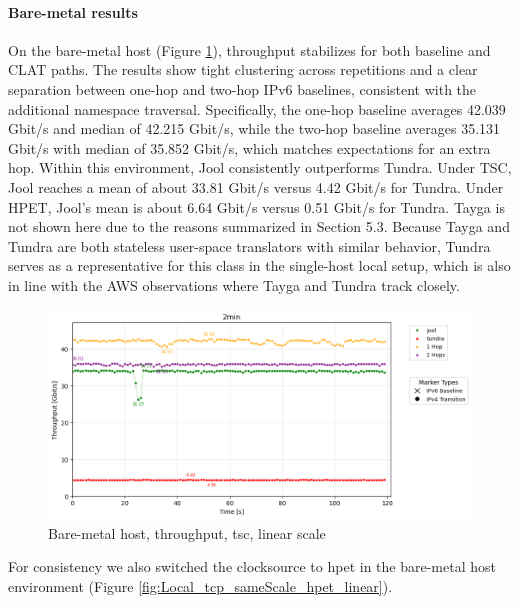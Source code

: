 \paragraph{Bare-metal results}

On the bare-metal host (Figure \ref{fig:Local_tcp_sameScale_tsc_linear}), throughput stabilizes for both baseline and CLAT paths. The results show tight clustering across repetitions and a clear separation between one-hop and two-hop IPv6 baselines, consistent with the additional namespace traversal. Specifically, the one-hop baseline averages 42.039 Gbit/s and median of 42.215 Gbit/s, while the two-hop baseline averages 35.131 Gbit/s with median of 35.852 Gbit/s, which matches expectations for an extra hop. Within this environment, Jool consistently outperforms Tundra. Under TSC, Jool reaches a mean of about 33.81 Gbit/s versus 4.42 Gbit/s for Tundra. Under HPET, Jool's mean is about 6.64 Gbit/s versus 0.51 Gbit/s for Tundra. Tayga is not shown here due to the reasons summarized in Section 5.3. Because Tayga and Tundra are both stateless user-space translators with similar behavior, Tundra serves as a representative for this class in the single-host local setup, which is also in line with the AWS observations where Tayga and Tundra track closely.

\begin{figure}[H]
    \centering
    \includegraphics[width=1\textwidth]{resources/finalPlots/combinedplots/SingleLocal_tcp_sameScale_tsc_2min_linear.png}
    \caption{Bare-metal host, throughput, tsc, linear scale}
    \label{fig:Local_tcp_sameScale_tsc_linear}
\end{figure}

For consistency we also switched the clocksource to hpet in the bare-metal host environment (Figure \ref{fig:Local_tcp_sameScale_hpet_linear}).

